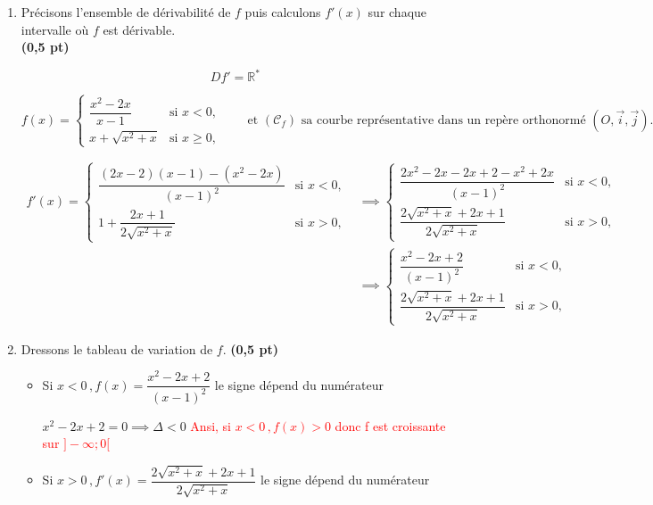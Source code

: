 \documentclass[12pt,a4paper]{article}
\begin{document}
\begin{enumerate}
    \textcolor{red}{Donc $(\Delta_2)$: $ y = 2x+\dfrac{1}{2}$ est une asymptote oblique à $(\mathcal{C}_f)$ en $+\infty$ }
    
    \item Précisons l'ensemble de dérivabilité de $f$ puis calculons $f'(x)$ sur chaque intervalle où $f$ est dérivable.\\ \textbf{(0,5 pt)}   

\[ Df' = \mathbb{R}^*\]    

\[
f(x)=
\begin{cases}
\dfrac{x^2-2x}{x-1} & \text{si } x<0,\\[4mm]
x + \sqrt{x^2+x} & \text{si } x\ge 0,
\end{cases}
\qquad
\text{et } (\mathcal{C}_f) \text{ sa courbe représentative dans un repère orthonormé } (O,\vec{i},\vec{j}).
\]

\[
\begin{aligned}
f'(x)=
\begin{cases}
\dfrac{(2x-2)(x-1)-(x^2-2x)}{(x-1)^{2}} & \text{si } x<0,\\[4mm]
1 + \dfrac{2x+1}{2\sqrt{x^2+x}} & \text{si } x > 0,
\end{cases}&\implies
\begin{cases}
\dfrac{2x^2-2x-2x+2-x^2+2x}{(x-1)^{2}} & \text{si } x<0,\\[4mm]
\dfrac{2\sqrt{x^2+x}+2x+1}{2\sqrt{x^2+x}} & \text{si } x > 0,
\end{cases}\\
&\implies
\begin{cases}
\dfrac{x^2-2x+2}{(x-1)^{2}} & \text{si } x<0,\\[4mm]
\dfrac{2\sqrt{x^2+x}+2x+1}{2\sqrt{x^2+x}} & \text{si } x > 0,
\end{cases}
\end{aligned}
\]    
    
    \item Dressons le tableau de variation de $f$. \hspace{1cm} \textbf{(0,5 pt)}

\begin{itemize}
\item Si \( x<0\,, f(x)=\dfrac{x^2-2x+2}{(x-1)^{2}} \)  le signe dépend du numérateur 

\( x^2-2x+2 = 0 \implies \Delta <0 \)
\textcolor{red}{ Ansi, si \( x<0\,, f(x) > 0 \)  donc f est croissante sur $]-\infty; 0[$}
\item Si $ x>0\,, f'(x)= \dfrac{2\sqrt{x^2+x}+2x+1}{2\sqrt{x^2+x}}$ le signe dépend du numérateur 


\end{itemize}
\end{enumerate}
\end{document}
